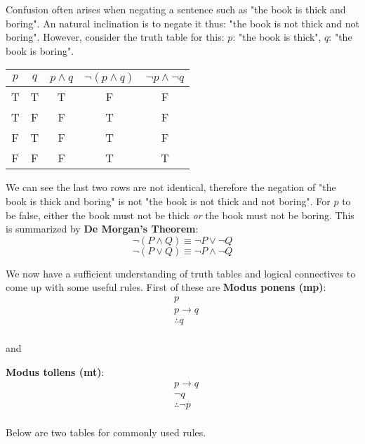 \documentclass[nobib]{tufte-handout}
\newcommand{\defn}[2]{\noindent\textbf{#1}:\ #2}
\begin{document}
Confusion often arises when negating a sentence such as 
"the book is thick and boring". An natural inclination is to 
negate it thus: "the book is not thick and not boring".
However, consider the truth table for this:
$p$: "the book is thick", $q$: "the book is boring". 
\begin{table}[ht]
    \centering
    \begin{tabular}{|c c|c|c|c|}
    \hline
    $p$ & $q$ & $p \wedge q$ & $\neg(p \wedge q)$ & $\neg p \wedge \neg q$\\
    \hline
    T & T & T & F & F\\
    T & F & F & T & F\\
    F & T & F & T & F\\
    F & F & F & T & T\\
    \hline
    \end{tabular}
    \label{tab:demorganswrong}
\end{table}
We can see the last two rows are not identical, therefore
the negation of "the book is thick and boring" is not 
"the book is not thick and not boring". For $p$ to be 
false, either the book must not be thick \emph{or} the
book must not be boring. This is summarized by 
\defn{De Morgan's Theorem}{
    \[\neg(P \wedge Q) \equiv \neg P \vee \neg Q\]
    \[\neg(P \vee Q) \equiv \neg P \wedge \neg Q\]
}

We now have a sufficient understanding of truth tables and 
logical connectives to come up with some useful rules. First of these 
are 
\defn{Modus ponens (mp)}{
    \begin{align*}
        &p \\
        &p \rightarrow q \\
        &\therefore q \\
    \end{align*}
}

and

\defn{Modus tollens (mt)}{
    \begin{align*}
        &p \rightarrow q \\
        &\neg q \\
        &\therefore \neg p \\
    \end{align*}
}

Below are two tables for commonly used rules.
\end{document}
